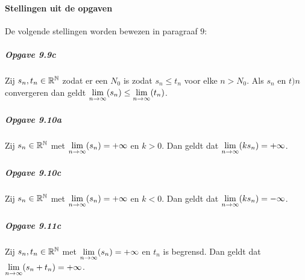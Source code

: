 \paragraph{Stellingen uit de opgaven} De volgende stellingen worden bewezen in paragraaf $9$:

\subparagraph{Opgave 9.9c} Zij $s_{n},t_{n}\in\mathbb{R}^{\mathbb{N}}$ zodat er een $N_{0}$ is zodat $s_{n} \leq t_{n}$ voor elke $n>N_{0}$. Als $s_{n}$ en $t){n}$ convergeren dan geldt $\underset{n\to\infty}{\text{lim}}(s_{n})\leq\underset{n\to\infty}{\text{lim}}(t_{n})$.

\subparagraph{Opgave 9.10a} Zij $s_{n}\in\mathbb{R}^{\mathbb{N}}$ met $\underset{n\to\infty}{\text{lim}}(s_{n})=+\infty$ en $k>0$. Dan geldt dat $\underset{n\to\infty}{\text{lim}}(ks_{n})=+\infty$.

\subparagraph{Opgave 9.10c} Zij $s_{n}\in\mathbb{R}^{\mathbb{N}}$ met $\underset{n\to\infty}{\text{lim}}(s_{n})=+\infty$ en $k<0$. Dan geldt dat $\underset{n\to\infty}{\text{lim}}(ks_{n})=-\infty$.

\subparagraph{Opgave 9.11c} Zij $s_{n},t_{n}\in\mathbb{R}^{\mathbb{N}}$ met $\underset{n\to\infty}{\text{lim}}(s_{n})=+\infty$ en $t_{n}$ is begrensd. Dan geldt dat\\ $\underset{n\to\infty}{\text{lim}}(s_{n}+t_{n})=+\infty$.
